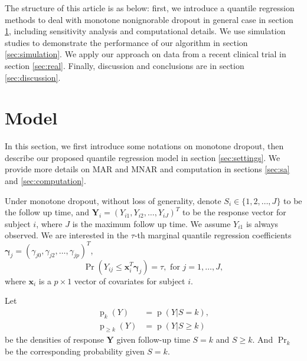 \documentclass[12pt]{article}
\DeclareMathOperator{\pr}{p}
\DeclareMathOperator{\prob}{Pr}
\begin{document}
The structure of this article is as below: first, we introduce a
quantile regression methods to deal with monotone nonignorable dropout
in general case in section \ref{sec:model}, including sensitivity
analysis and computational details.  We use simulation studies to
demonstrate the performance of our algorithm in section
\ref{sec:simulation}. We apply our approach on data from a recent
clinical trial in section \ref{sec:real}. Finally, discussion and
conclusions are in section \ref{sec:discussion}.

\section{Model}
\label{sec:model}

In this section, we first introduce some notations on monotone
dropout, then describe our proposed quantile regression model in
section \ref{sec:settings}. We provide more details on MAR and MNAR
and computation in sections \ref{sec:sa} and \ref{sec:computation}.

Under monotone dropout, without loss of generality, denote $S_i \in
\{1, 2, \ldots, J\}$ to be the follow up time, and $\bm Y_i = (Y_{i1},
Y_{i2}, \ldots, Y_{iJ})^{T}$ to be the response vector for subject
$i$, where $J$ is the maximum follow up time. We assume $Y_{i1}$ is
always observed. We are interested in the $\tau$-th marginal quantile
regression coefficients $\bm \gamma_j = (\gamma_{j0}, \gamma_{j2},
\ldots, \gamma_{jp})^T$,
\begin{equation}
  \label{eq:quantile}
  \prob (Y_{ij} \leq \bm x_i^{T} \bm \gamma_j ) = \tau, \text{ for } j = 1, \ldots, J,
\end{equation}
where $\bm x_i$ is a $p \times 1$ vector of covariates for subject $i$.

Let
\begin{align*}
  \pr_k(Y) &= \pr (Y | S = k), \\
  \pr_{\geq k} (Y) & = \pr (Y | S \geq k)
\end{align*}
be the densities of response $\bm Y$ given follow-up time $S=k$ and $S
\geq k$. And $\prob_k$ be the corresponding probability given $S = k$.
\end{document}
